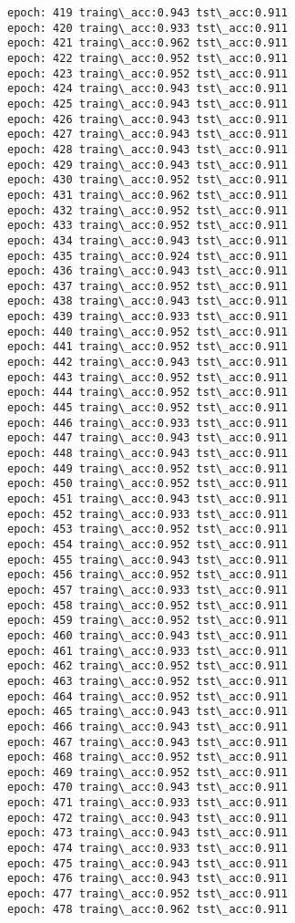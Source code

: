 \documentclass[11pt]{article}
\begin{document}
\begin{Verbatim}[commandchars=\\\{\}]
epoch: 419 traing\_acc:0.943 tst\_acc:0.911
epoch: 420 traing\_acc:0.933 tst\_acc:0.911
epoch: 421 traing\_acc:0.962 tst\_acc:0.911
epoch: 422 traing\_acc:0.952 tst\_acc:0.911
epoch: 423 traing\_acc:0.952 tst\_acc:0.911
epoch: 424 traing\_acc:0.943 tst\_acc:0.911
epoch: 425 traing\_acc:0.943 tst\_acc:0.911
epoch: 426 traing\_acc:0.943 tst\_acc:0.911
epoch: 427 traing\_acc:0.943 tst\_acc:0.911
epoch: 428 traing\_acc:0.943 tst\_acc:0.911
epoch: 429 traing\_acc:0.943 tst\_acc:0.911
epoch: 430 traing\_acc:0.952 tst\_acc:0.911
epoch: 431 traing\_acc:0.962 tst\_acc:0.911
epoch: 432 traing\_acc:0.952 tst\_acc:0.911
epoch: 433 traing\_acc:0.952 tst\_acc:0.911
epoch: 434 traing\_acc:0.943 tst\_acc:0.911
epoch: 435 traing\_acc:0.924 tst\_acc:0.911
epoch: 436 traing\_acc:0.943 tst\_acc:0.911
epoch: 437 traing\_acc:0.952 tst\_acc:0.911
epoch: 438 traing\_acc:0.943 tst\_acc:0.911
epoch: 439 traing\_acc:0.933 tst\_acc:0.911
epoch: 440 traing\_acc:0.952 tst\_acc:0.911
epoch: 441 traing\_acc:0.952 tst\_acc:0.911
epoch: 442 traing\_acc:0.943 tst\_acc:0.911
epoch: 443 traing\_acc:0.952 tst\_acc:0.911
epoch: 444 traing\_acc:0.952 tst\_acc:0.911
epoch: 445 traing\_acc:0.952 tst\_acc:0.911
epoch: 446 traing\_acc:0.933 tst\_acc:0.911
epoch: 447 traing\_acc:0.943 tst\_acc:0.911
epoch: 448 traing\_acc:0.943 tst\_acc:0.911
epoch: 449 traing\_acc:0.952 tst\_acc:0.911
epoch: 450 traing\_acc:0.952 tst\_acc:0.911
epoch: 451 traing\_acc:0.943 tst\_acc:0.911
epoch: 452 traing\_acc:0.933 tst\_acc:0.911
epoch: 453 traing\_acc:0.952 tst\_acc:0.911
epoch: 454 traing\_acc:0.952 tst\_acc:0.911
epoch: 455 traing\_acc:0.943 tst\_acc:0.911
epoch: 456 traing\_acc:0.952 tst\_acc:0.911
epoch: 457 traing\_acc:0.933 tst\_acc:0.911
epoch: 458 traing\_acc:0.952 tst\_acc:0.911
epoch: 459 traing\_acc:0.952 tst\_acc:0.911
epoch: 460 traing\_acc:0.943 tst\_acc:0.911
epoch: 461 traing\_acc:0.933 tst\_acc:0.911
epoch: 462 traing\_acc:0.952 tst\_acc:0.911
epoch: 463 traing\_acc:0.952 tst\_acc:0.911
epoch: 464 traing\_acc:0.952 tst\_acc:0.911
epoch: 465 traing\_acc:0.943 tst\_acc:0.911
epoch: 466 traing\_acc:0.943 tst\_acc:0.911
epoch: 467 traing\_acc:0.943 tst\_acc:0.911
epoch: 468 traing\_acc:0.952 tst\_acc:0.911
epoch: 469 traing\_acc:0.952 tst\_acc:0.911
epoch: 470 traing\_acc:0.943 tst\_acc:0.911
epoch: 471 traing\_acc:0.933 tst\_acc:0.911
epoch: 472 traing\_acc:0.943 tst\_acc:0.911
epoch: 473 traing\_acc:0.943 tst\_acc:0.911
epoch: 474 traing\_acc:0.933 tst\_acc:0.911
epoch: 475 traing\_acc:0.943 tst\_acc:0.911
epoch: 476 traing\_acc:0.943 tst\_acc:0.911
epoch: 477 traing\_acc:0.952 tst\_acc:0.911
epoch: 478 traing\_acc:0.962 tst\_acc:0.911

\end{Verbatim}
\end{document}
